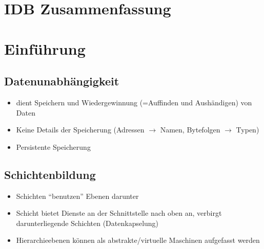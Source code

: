 \documentclass[a4paper, 12pt]{scrartcl}
\begin{document}
\section*{IDB Zusammenfassung}
\tableofcontents
\section{Einführung}
\subsection{Datenunabhängigkeit}
\begin{itemize}
	\item
		dient Speichern und Wiedergewinnung (=Auffinden und Aushändigen) von Daten
	\item
		Keine Details der Speicherung (Adressen $\rightarrow$ Namen, Bytefolgen $\rightarrow$ Typen)
	\item
		Persistente Speicherung
\end{itemize}
\subsection{Schichtenbildung}
\begin{itemize}
	\item Schichten \enquote{benutzen} Ebenen darunter
	\item Schicht bietet Dienste an der Schnittstelle nach oben an, verbirgt darunterliegende Schichten (Datenkapselung)
	\item
		Hierarchieebenen können als abstrakte/virtuelle Maschinen aufgefasst werden
\end{itemize}
\end{document}
